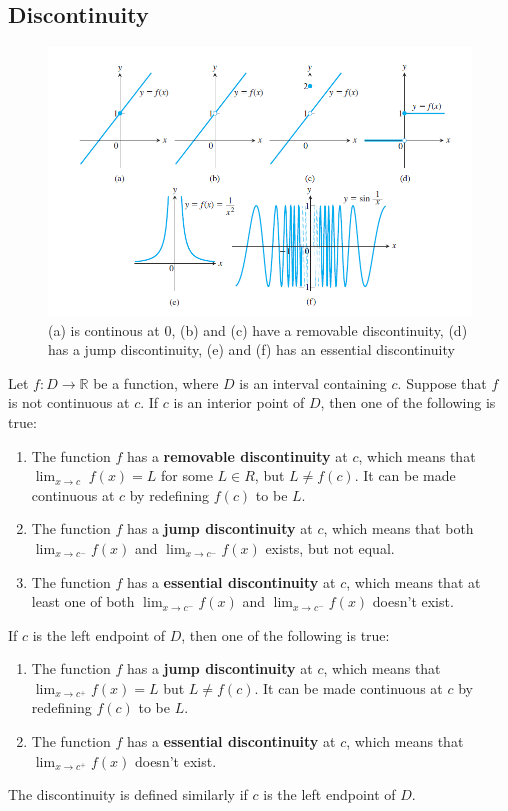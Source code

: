 \documentclass[12pt]{article}
\begin{document}
\subsection{Discontinuity}
\begin{figure}[h!]
    \centering
    \includegraphics[width=0.7\linewidth]{Images/Discontinuity.png}
    \caption{(a) is continous at 0, (b) and (c) have a removable discontinuity, (d) has a jump discontinuity, 
    (e) and (f) has an essential discontinuity}
\end{figure}

Let $f : D \rightarrow \mathbb{R}$ be a function, where $D$ is an interval containing $c$.
Suppose that $f$ is not continuous at $c$. If $c$ is an interior point of $D$, 
then one of the following is true:
\begin{enumerate}[i] 
     \item The function $f$ has a \textbf{removable discontinuity} at $c$, which
     means that $\lim_{x \to c} \; f(x) = L$ for some $L \in R$, but $L \neq f(c)$. It
     can be made continuous at $c$ by redefining $f(c)$ to be $L$.
     \item The function $f$ has a \textbf{jump discontinuity} at $c$, which
     means that both $\lim_{x \to c^-} f(x)$ and $\lim_{x \to c^-} f(x)$ exists, but not equal.
     \item The function $f$ has a \textbf{essential discontinuity} at $c$, which
     means that at least one of both $\lim_{x \to c^-} f(x)$ and $\lim_{x \to c^-} f(x)$ doesn't exist.
\end{enumerate}
If $c$ is the left endpoint of $D$, then one of the following is true:
\begin{enumerate}[i] 
    \item The function $f$ has a \textbf{jump discontinuity} at $c$, which
    means that $\lim_{x \to c^+} f(x) = L$ but $L \neq f(c)$. It
    can be made continuous at $c$ by redefining $f(c)$ to be $L$.
    \item The function $f$ has a \textbf{essential discontinuity} at $c$, which
    means that $\lim_{x \to c^+} f(x)$ doesn't exist.
\end{enumerate}
The discontinuity is defined similarly if $c$ is the left endpoint of $D$.
\end{document}
